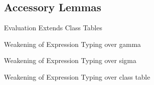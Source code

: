 \documentclass[acmlarge, anonymous, authordraft, review]{acmart} %
\begin{document}
\subsection*{Accessory Lemmas}

\begin{lemma}{Evaluation Extends Class Tables}{}
  \begin{conds}
    \cond{$\Reduce \K\e\s \Kp\ep\sp$}
  \end{conds}

  \then{}

\end{lemma}

\begin{lemma}{Weakening of Expression Typing over gamma}{}
  \begin{conds}
    \cond{$\EnvType\Env\s\K\e\t$}
  \end{conds}

  \then\axiom{$\EnvType{\Env~\Envp}\s\K\e\t$}

\end{lemma}

\begin{lemma}{Weakening of Expression Typing over sigma}{}
  \begin{conds}
    \cond{$\EnvType\Env\s\K\e\t$}
  \end{conds}

  \then{}

\end{lemma}

\begin{lemma}{Weakening of Expression Typing over class table}{}
  \begin{conds}
    \cond{$\EnvType\Env\s\K\e\t$}
  \end{conds}

  \then\axiom{$\EnvType\Env\s{\K~\Kp}\e\t$}

\end{lemma}
\end{document}
